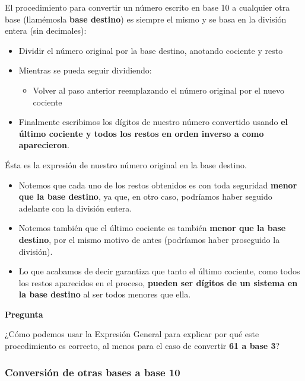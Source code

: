 \documentclass[spanish,A4,]{article}
\begin{document}
El procedimiento para convertir un número escrito en base 10 a cualquier
otra base (llamémosla \textbf{base destino}) es siempre el mismo y se
basa en la división entera (sin decimales):

\begin{itemize}
\itemsep1pt\parskip0pt
\item
  Dividir el número original por la base destino, anotando cociente y
  resto
\item
  Mientras se pueda seguir dividiendo:

  \begin{itemize}
  \itemsep1pt\parskip0pt
  \item
    Volver al paso anterior reemplazando el número original por el nuevo
    cociente
  \end{itemize}
\item
  Finalmente escribimos los dígitos de nuestro número convertido usando
  \textbf{el último cociente y todos los restos en orden inverso a como
  aparecieron}.
\end{itemize}

Ésta es la expresión de nuestro número original en la base destino.

\begin{itemize}
\itemsep1pt\parskip0pt
\item
  Notemos que cada uno de los restos obtenidos es con toda seguridad
  \textbf{menor que la base destino}, ya que, en otro caso, podríamos
  haber seguido adelante con la división entera.
\item
  Notemos también que el último cociente es también \textbf{menor que la
  base destino}, por el mismo motivo de antes (podríamos haber
  proseguido la división).
\item
  Lo que acabamos de decir garantiza que tanto el último cociente, como
  todos los restos aparecidos en el proceso, \textbf{pueden ser dígitos
  de un sistema en la base destino} al ser todos menores que ella.
\end{itemize}

\textbf{Pregunta}

¿Cómo podemos usar la Expresión General para explicar por qué este
procedimiento es correcto, al menos para el caso de convertir \textbf{61
a base 3}?

\subsubsection{Conversión de otras bases a base
10}\label{conversiuxf3n-de-otras-bases-a-base-10}
\end{document}
